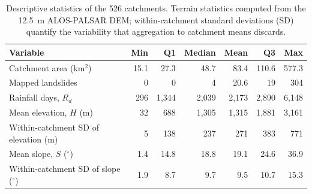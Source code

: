 \begin{table}[h]
\caption{Descriptive statistics of the 526 catchments. Terrain statistics computed from the 12.5~m ALOS-PALSAR DEM; within-catchment standard deviations (SD) quantify the variability that aggregation to catchment means discards.}\label{tabA1}
\footnotesize
\begin{tabular}{@{}lrrrrrr@{}}
\toprule
Variable & Min & Q1 & Median & Mean & Q3 & Max \\
\midrule
Catchment area (km$^2$) & 15.1 & 27.3 & 48.7 & 83.4 & 110.6 & 577.3 \\
Mapped landslides & 0 & 0 & 4 & 20.6 & 19 & 304 \\
Rainfall days, $R_d$ & 296 & 1,344 & 2,039 & 2,173 & 2,890 & 6,148 \\
Mean elevation, $H$ (m) & 32 & 688 & 1,305 & 1,315 & 1,881 & 3,161 \\
Within-catchment SD of elevation (m) & 5 & 138 & 237 & 271 & 383 & 771 \\
Mean slope, $S$ ($^{\circ}$) & 1.4 & 14.8 & 18.8 & 19.1 & 24.6 & 36.9 \\
Within-catchment SD of slope ($^{\circ}$) & 1.9 & 8.7 & 9.7 & 9.5 & 10.7 & 15.3 \\
\bottomrule
\end{tabular}
\end{table}

